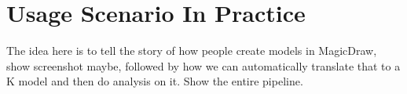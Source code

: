 \section{Usage Scenario In Practice}

The idea here is to tell the story of how people create models in
MagicDraw, show screenshot maybe, followed by how we can automatically
translate that to a K model and then do analysis on it. Show the
entire pipeline.
